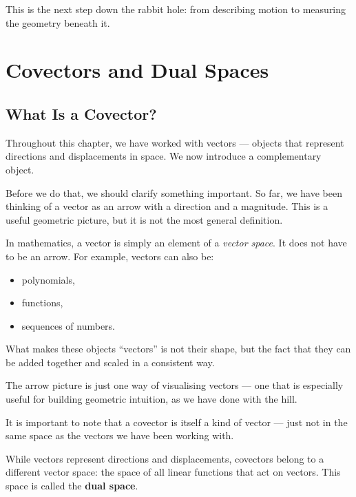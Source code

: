 \documentclass[11pt,openany]{book}
\theoremstyle{definition}
\begin{document}
\medskip

This is the next step down the rabbit hole: from describing motion to measuring the
geometry beneath it.

\chapter{Covectors and Dual Spaces}

\section{What Is a Covector?}

Throughout this chapter, we have worked with vectors --- objects that represent
directions and displacements in space. We now introduce a complementary object.

\medskip

Before we do that, we should clarify something important. So far, we have been thinking
of a vector as an arrow with a direction and a magnitude. This is a useful geometric picture,
but it is not the most general definition.

\medskip

In mathematics, a vector is simply an element of a \textit{vector space}. It does not have
to be an arrow. For example, vectors can also be:
\begin{itemize}
  \item polynomials,
  \item functions,
  \item sequences of numbers.
\end{itemize}

\medskip

What makes these objects ``vectors'' is not their shape, but the fact that they can be
added together and scaled in a consistent way.

\medskip

The arrow picture is just one way of visualising vectors --- one that is especially useful
for building geometric intuition, as we have done with the hill.

\medskip

\medskip

It is important to note that a covector is itself a kind of vector --- just not in the
same space as the vectors we have been working with.

\medskip

While vectors represent directions and displacements, covectors belong to a different
vector space: the space of all linear functions that act on vectors. This space is
called the \textbf{dual space}.
\end{document}
